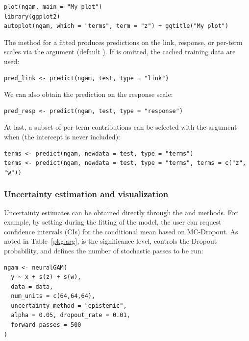 \begin{Verbatim}
plot(ngam, main = "My plot")
library(ggplot2)
autoplot(ngam, which = "terms", term = "z") + ggtitle("My plot")
\end{Verbatim}

The  method for a fitted  produces predictions on the link, response, or per-term scales via the  argument (default ). If  is omitted, the cached training data are used:

\begin{Verbatim}
pred_link <- predict(ngam, test, type = "link")
\end{Verbatim}

We can also obtain the prediction on the response scale:

\begin{Verbatim}
pred_resp <- predict(ngam, test, type = "response")
\end{Verbatim}

At last, a subset of per-term contributions can be selected with the  argument when  (the intercept is never included): 

\begin{Verbatim}
terms <- predict(ngam, newdata = test, type = "terms")
terms <- predict(ngam, newdata = test, type = "terms", terms = c("z", "w"))
\end{Verbatim}

\subsubsection{Uncertainty estimation and visualization} \label{uncertainty-est-imp}

Uncertainty estimates can be obtained directly through the  and  methods. For example, by setting  during the fitting of the model, the user can request confidence intervals (CIs) for the conditional mean based on MC-Dropout. As noted in Table~\ref{pkg:arg},  is the significance level,  controls the Dropout probability, and  defines the number of stochastic passes to be run:

\begin{Verbatim}
ngam <- neuralGAM(
  y ~ x + s(z) + s(w),
  data = data,
  num_units = c(64,64,64),
  uncertainty_method = "epistemic",
  alpha = 0.05, dropout_rate = 0.01, 
  forward_passes = 500
)
\end{Verbatim}

